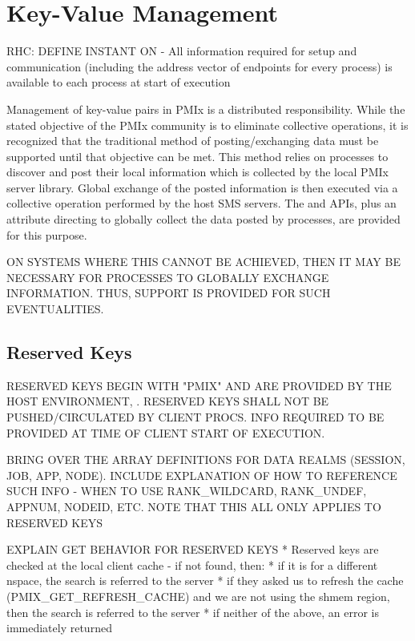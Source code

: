 \chapter{Key-Value Management}
\label{chap:api_kv_mgmt}



RHC: DEFINE INSTANT ON - All information required for setup and communication (including the address vector of endpoints for every process) is available to each process at start of execution

Management of key-value pairs in \ac{PMIx} is a distributed responsibility. While the stated objective of the \ac{PMIx} community is to eliminate collective operations, it is recognized that the traditional method of posting/exchanging data must be supported until that objective can be met. This method relies on processes to discover and post their local information which is collected by the local PMIx server library. Global exchange of the posted information is then executed via a collective operation performed by the host \ac{SMS} servers. The  and  \acp{API}, plus an attribute directing  to globally collect the data posted by processes, are provided for this purpose.

ON SYSTEMS WHERE THIS CANNOT BE ACHIEVED, THEN IT MAY BE NECESSARY FOR
PROCESSES TO GLOBALLY EXCHANGE INFORMATION.  THUS, SUPPORT IS PROVIDED FOR SUCH EVENTUALITIES.



\section{Reserved Keys}
RESERVED KEYS BEGIN WITH "PMIX" AND ARE PROVIDED BY THE HOST ENVIRONMENT, . RESERVED KEYS SHALL NOT BE PUSHED/CIRCULATED BY CLIENT PROCS. INFO REQUIRED TO BE PROVIDED AT TIME OF CLIENT START OF EXECUTION.

BRING OVER THE ARRAY DEFINITIONS FOR DATA REALMS (SESSION, JOB, APP, NODE). INCLUDE EXPLANATION OF HOW TO REFERENCE SUCH INFO - WHEN TO USE RANK_WILDCARD, RANK_UNDEF, APPNUM, NODEID, ETC. NOTE THAT THIS ALL ONLY APPLIES TO RESERVED KEYS

EXPLAIN GET BEHAVIOR FOR RESERVED KEYS
* Reserved keys are checked at the local client cache - if not found, then:
    * if it is for a different nspace, the search is referred to the server
    * if they asked us to refresh the cache (PMIX_GET_REFRESH_CACHE) and we are not using the shmem region, then the search is referred to the server
    * if neither of the above, an error is immediately returned


